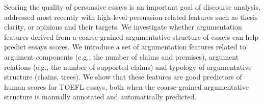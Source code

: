 Scoring the quality of persuasive essays is an important goal of discourse analysis, addressed most recently with high-level persuasion-related features such as thesis clarity, or opinions and their targets.              We investigate whether argumentation features derived from a coarse-grained argumentative structure of essays can help predict essays scores. We introduce a set of argumentation features related to argument components (e.g., the number of claims and premises), argument relations (e.g., the number of supported claims) and typology of argumentative structure (chains, trees). We show that these features are good predictors of human scores for TOEFL essays, both when the coarse-grained argumentative structure is manually annotated and automatically predicted.
